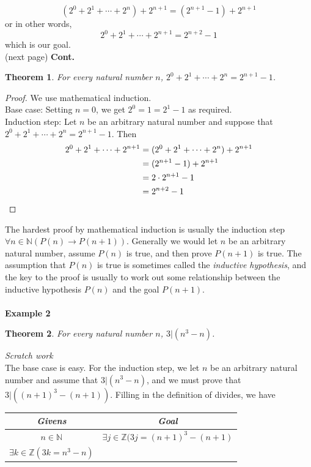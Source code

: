 \documentclass{report}
\newtheorem*{theorem}{Theorem}
\theoremstyle{definition}
\begin{document}
\begin{equation*}
(2^0+2^1+\cdots+2^n)+2^{n+1}=(2^{n+1}-1)+2^{n+1}
\end{equation*}
or in other words,
\begin{equation*}
2^0+2^1+\cdots+2^{n+1}=2^{n+2}-1
\end{equation*}
which is our goal.\\
(next page)\newpage
\noindent\textbf{Cont.}
\begin{theorem}
For every natural number $n$, $2^0+2^1+\cdots+2^n=2^{n+1}-1$.
\end{theorem}
\begin{proof}
We use mathematical induction.\\
\indent Base case: Setting $n=0$, we get $2^0=1=2^1-1$ as required.\\
\indent Induction step: Let $n$ be an arbitrary natural number and suppose that $2^0+2^1+\cdots+2^n=2^{n+1}-1$. Then
\begin{align*}
2^0+2^1+\cdots+2^{n+1}&=(2^0+2^1+\cdots+2^n)+2^{n+1}\\
&=(2^{n+1}-1)+2^{n+1}\\
&=2\cdot2^{n+1}-1\\
&=2^{n+2}-1\qedhere
\end{align*}
\end{proof}
\noindent The hardest proof by mathematical induction is usually the induction step $\forall n\in\mathbb N(P(n)\to P(n+1))$. 
Generally we would let $n$ be an arbitrary natural number, assume $P(n)$ is true,
and then prove $P(n+1)$ is true. The assumption that $P(n)$ is true is sometimes called the 
\textit{inductive hypothesis}, and the key to the proof is usually to work out some relationship between the inductive hypothesis $P(n)$ and the goal $P(n+1)$.\\
\vspace{1mm}\\
\textbf{Example 2}
\begin{theorem}
For every natural number $n$, $3|(n^3-n)$.
\end{theorem}
\noindent\textit{Scratch work}\\
The base case is easy. For the induction step, we let $n$ be an arbitrary natural number and assume that $3|(n^3-n)$, and we must prove that $3|((n+1)^3-(n+1))$.
Filling in the definition of divides, we have
\begin{center}
\begin{tabular}{c|c}
\textit{Givens}&\textit{Goal}\\
\hline
$n\in\mathbb N$&$\exists j\in\mathbb Z(3j=(n+1)^3-(n+1)$\\
$\exists k\in\mathbb Z(3k=n^3-n)$&
\end{tabular}
\end{center}
\end{document}
